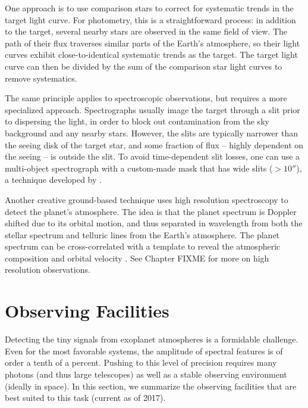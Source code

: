 \documentclass[graybox,natbib,nosecnum]{svmult}
\begin{document}
One approach is to use comparison stars to correct for systematic trends in the target light curve. For photometry, this is a straightforward process: in addition to the target, several nearby stars are observed in the same field of view. The path of their flux traverses similar parts of the Earth's atmosphere, so their light curves exhibit close-to-identical systematic trends as the target. The target light curve can then be divided by the sum of the comparison star light curves to remove systematics.  %

The same principle applies to spectroscopic observations, but requires a more specialized approach.  Spectrographs usually image the target through a slit prior to dispersing the light, in order to block out contamination from the sky background and any nearby stars. However, the slits are typically narrower than the seeing disk of the target star, and some fraction of flux -- highly dependent on the seeing -- is outside the slit.  To avoid time-dependent slit losses, one can use a multi-object spectrograph with a custom-made mask that has wide slits ($>10''$), a technique developed by \cite{bean10}. %

Another creative ground-based technique uses high resolution spectroscopy to detect the planet's atmosphere.  The idea is that the planet spectrum is Doppler shifted due to its orbital motion, and thus separated in wavelength from both the stellar spectrum and telluric lines from the Earth's atmosphere. The planet spectrum can be cross-correlated with a template to reveal the atmospheric composition and orbital velocity \citep[e.g.][]{snellen10}.  See Chapter FIXME for more on high resolution observations. 

\section{Observing Facilities}
Detecting the tiny signals from exoplanet atmospheres is a formidable challenge. Even for the most favorable systems, the amplitude of spectral features is of order a tenth of a percent. Pushing to this level of precision requires many photons (and thus large telescopes) as well as a stable observing environment (ideally in space).  In this section, we summarize the observing facilities that are best suited to this task (current as of 2017).
\end{document}
